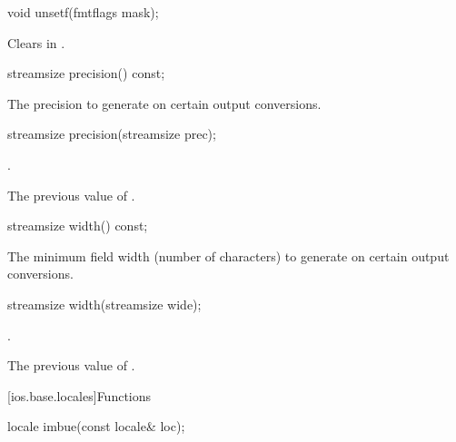 %
\begin{itemdecl}
void unsetf(fmtflags mask);
\end{itemdecl}

\begin{itemdescr}
\pnum
\effects
Clears  in
.
\end{itemdescr}

%
\begin{itemdecl}
streamsize precision() const;
\end{itemdecl}

\begin{itemdescr}
\pnum
\returns
The precision
to generate on certain output conversions.
\end{itemdescr}

%
\begin{itemdecl}
streamsize precision(streamsize prec);
\end{itemdecl}

\begin{itemdescr}
\pnum
\ensures
{}.

\pnum
\returns
The previous value of
.
\end{itemdescr}

%
\begin{itemdecl}
streamsize width() const;
\end{itemdecl}

\begin{itemdescr}
\pnum
\returns
The minimum field width (number of characters) to generate on certain output
conversions.
\end{itemdescr}

%
\begin{itemdecl}
streamsize width(streamsize wide);
\end{itemdecl}

\begin{itemdescr}
\pnum
\ensures
{}.

\pnum
\returns
The previous value of
.
\end{itemdescr}

[ios.base.locales]{Functions}

%
\begin{itemdecl}
locale imbue(const locale& loc);
\end{itemdecl}

